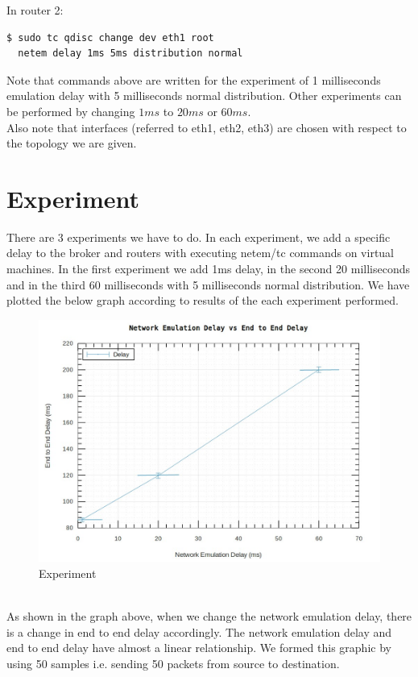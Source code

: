 \documentclass[conference]{IEEEtran}
\begin{document}
In router 2:

\begin{lstlisting}[language=bash]
  $ sudo tc qdisc change dev eth1 root 
  netem delay 1ms 5ms distribution normal

\end{lstlisting}

Note that commands above are written for the experiment of 1 milliseconds emulation delay with 5 milliseconds normal distribution. Other experiments can be performed by changing $1ms$ to $20ms$ or $60ms$.\\
Also note that interfaces (referred to eth1, eth2, eth3) are chosen with respect to the topology we are given.\\
\section{Experiment}
There are 3 experiments we have to do. In each experiment, we add a specific delay to the broker and routers with executing netem/tc commands on virtual machines. In the first experiment we add 1ms delay, in the second 20 milliseconds and in the third 60 milliseconds with 5 milliseconds normal distribution.
We have plotted the below graph according to results of the each experiment performed. \\
\begin{figure}[ht]
  \includegraphics[width=\linewidth]{experiment.jpeg}
  \caption{Experiment}
  \label{fig:boat1}
\end{figure}\\
As shown in the graph above, when we change the network emulation delay, there is a change in end to end delay accordingly. The network emulation delay and end to end delay have almost a linear relationship.
We formed this graphic by using 50 samples i.e. sending 50 packets from source to destination.
\end{document}
